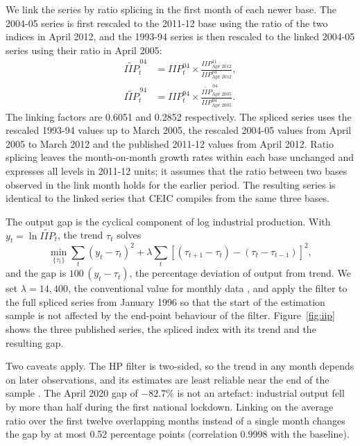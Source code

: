 \documentclass[10pt,twocolumn,a4paper]{article}
\begin{document}
We link the series by ratio splicing in the first month of each newer base. The 2004-05 series is first rescaled to the 2011-12 base using the ratio of the two indices in April 2012, and the 1993-94 series is then rescaled to the linked 2004-05 series using their ratio in April 2005:
\begin{align}
\widetilde{IIP}^{\,04}_t &= IIP^{04}_t \times \frac{IIP^{11}_{\text{Apr 2012}}}{IIP^{04}_{\text{Apr 2012}}}, \label{eq:splice1}\\[4pt]
\widetilde{IIP}^{\,94}_t &= IIP^{94}_t \times \frac{\widetilde{IIP}^{\,04}_{\text{Apr 2005}}}{IIP^{94}_{\text{Apr 2005}}}. \label{eq:splice2}
\end{align}
The linking factors are 0.6051 and 0.2852 respectively. The spliced series uses the rescaled 1993-94 values up to March 2005, the rescaled 2004-05 values from April 2005 to March 2012 and the published 2011-12 values from April 2012. Ratio splicing leaves the month-on-month growth rates within each base unchanged and expresses all levels in 2011-12 units; it assumes that the ratio between two bases observed in the link month holds for the earlier period. The resulting series is identical to the linked series that CEIC compiles from the same three bases.

The output gap is the cyclical component of log industrial production. With $y_t=\ln \widetilde{IIP}_t$, the \citet{hodrick1997} trend $\tau_t$ solves
\begin{equation}
\min_{\{\tau_t\}} \sum_{t}(y_t-\tau_t)^2 + \lambda\sum_{t}\left[(\tau_{t+1}-\tau_t)-(\tau_t-\tau_{t-1})\right]^2 ,
\end{equation}
and the gap is $100\,(y_t-\tau_t)$, the percentage deviation of output from trend. We set $\lambda=14{,}400$, the conventional value for monthly data \citep{ravn2002}, and apply the filter to the full spliced series from January 1996 so that the start of the estimation sample is not affected by the end-point behaviour of the filter. Figure~\ref{fig:iip} shows the three published series, the spliced index with its trend and the resulting gap.

Two caveats apply. The HP filter is two-sided, so the trend in any month depends on later observations, and its estimates are least reliable near the end of the sample \citep{hamilton2018}. The April 2020 gap of $-82.7\%$ is not an artefact: industrial output fell by more than half during the first national lockdown. Linking on the average ratio over the first twelve overlapping months instead of a single month changes the gap by at most 0.52 percentage points (correlation 0.9998 with the baseline).
\end{document}
